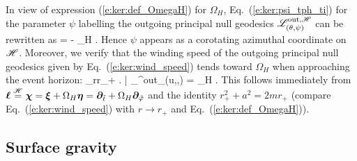 In view of expression (\ref{e:ker:def_OmegaH}) for $\Omega_H$,
Eq.~(\ref{e:ker:psi_tph_ti}) for the parameter $\psi$
labelling the outgoing principal null geodesics $\mathscr{L}^{{\rm out},\mathscr{H}}_{(\theta,\psi)}$
can be rewritten as
\be
    \psi = \tph - \Omega_H \ti .
\ee
Hence $\psi$ appears as a corotating azimuthal coordinate on $\mathscr{H}$.
Moreover, we verify that the winding speed of the outgoing principal
null geodesics given by Eq.~(\ref{e:ker:wind_speed}) tends toward
$\Omega_H$ when approaching the event horizon:
\be
    \lim_{r\rightarrow r_+}
    \left. \frac{\D\tph}{\D\ti} \right| _{\Li^{\rm out}_{(u,\th,\tilde{\tph})}}
    = \Omega_H .
\ee
This follows immediately from
$\bm{\ell} \stackrel{\mathscr{H}}{=} \bm{\chi} = \bm{\xi} + \Omega_H \bm{\eta} = \bm{\partial}_{{\tilde t}}
    + \Omega_H \bm{\partial}_{{\tilde\varphi}} $
and the identity $r_+^2 + a^2 = 2 m r_+$ (compare Eq.~(\ref{e:ker:wind_speed})
with $r\rightarrow r_+$ and Eq.~(\ref{e:ker:def_OmegaH})).


\subsection{Surface gravity} \label{s:ker:surf_grav}

